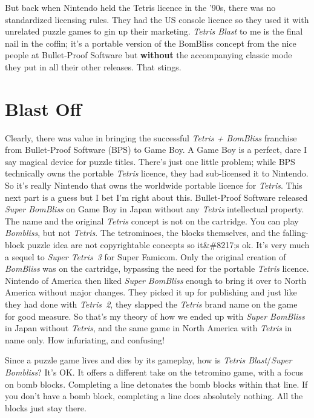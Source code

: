 \documentclass{book}
\begin{document}
But back when Nintendo held the Tetris licence in the ’90s, there was no standardized licensing rules. They had the US console licence so they used it with unrelated puzzle games to gin up their marketing. \emph{Tetris Blast} to me is the final nail in the coffin; it’s a portable version of the BomBliss concept from the nice people at Bullet-Proof Software but \textbf{without} the accompanying classic mode they put in all their other releases. That stings.

\FloatBarrier\needspace{10mm}\section*{Blast Off}\nopagebreak[4]

Clearly, there was value in bringing the successful \emph{Tetris + BomBliss} franchise from Bullet-Proof Software (BPS) to Game Boy. A Game Boy is a perfect, dare I say magical device for puzzle titles. There’s just one little problem; while BPS technically owns the portable \emph{Tetris} licence, they had sub-licensed it to Nintendo. So it’s really Nintendo that owns the worldwide portable licence for \emph{Tetris}. This next part is a guess but I bet I’m right about this. Bullet-Proof Software released \emph{Super BomBliss} on Game Boy in Japan without any \emph{Tetris} intellectual property. The name and the original \emph{Tetris} concept is not on the cartridge. You can play \emph{Bombliss}, but not \emph{Tetris}. The tetrominoes, the blocks themselves, and the falling-block puzzle idea are not copyrightable concepts so it&\#8217;s ok. It’s very much a sequel to \emph{Super Tetris 3} for Super Famicom. Only the original creation of \emph{BomBliss} was on the cartridge, bypassing the need for the portable \emph{Tetris} licence. Nintendo of America then liked \emph{Super BomBliss} enough to bring it over to North America without major changes. They picked it up for publishing and just like they had done with \emph{Tetris 2}, they slapped the \emph{Tetris} brand name on the game for good measure. So that’s my theory of how we ended up with \emph{Super BomBliss} in Japan without \emph{Tetris}, and the same game in North America with \emph{Tetris} in name only. How infuriating, and confusing!

Since a puzzle game lives and dies by its gameplay, how is \emph{Tetris Blast}/\emph{Super Bombliss}? It’s OK. It offers a different take on the tetromino game, with a focus on bomb blocks. Completing a line detonates the bomb blocks within that line. If you don’t have a bomb block, completing a line does absolutely nothing. All the blocks just stay there.
\end{document}
